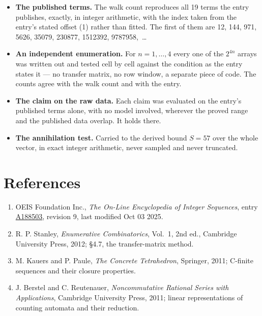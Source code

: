 \documentclass[11pt]{article}
\theoremstyle{definition}
\begin{document}
\begin{itemize}

\item {\bfseries The published terms.} The walk count reproduces all 19 terms the entry publishes, exactly, in integer arithmetic, with the index taken from the entry's stated offset (1) rather than fitted. The first of them are 12, 144, 971, 5626, 35079, 230877, 1512392, 9787958,~\dots

\item {\bfseries An independent enumeration.} For $n = 1,\dots,4$ every one of the $2^{4n}$ arrays was written out and tested cell by cell against the condition as the entry states it --- no transfer matrix, no row window, a separate piece of code. The counts agree with the walk count and with the entry.

\item {\bfseries The claim on the raw data.} Each claim was evaluated on the entry's published terms alone, with no model involved, wherever the proved range and the published data overlap. It holds there.

\item {\bfseries The annihilation test.} Carried to the derived bound $S = 57$ over the whole vector, in exact integer arithmetic, never sampled and never truncated.

\end{itemize}

\section{References}

\begin{enumerate}

\item OEIS Foundation Inc., \emph{The On-Line Encyclopedia of Integer Sequences}, entry \href{https://oeis.org/A188503}{A188503}, revision 9, last modified Oct 03 2025.

\item R. P. Stanley, \emph{Enumerative Combinatorics}, Vol.~1, 2nd ed., Cambridge University Press, 2012; \S4.7, the transfer-matrix method.

\item M. Kauers and P. Paule, \emph{The Concrete Tetrahedron}, Springer, 2011; C-finite sequences and their closure properties.

\item J. Berstel and C. Reutenauer, \emph{Noncommutative Rational Series with Applications}, Cambridge University Press, 2011; linear representations of counting automata and their reduction.

\end{enumerate}
\end{document}
